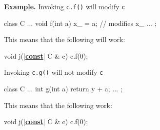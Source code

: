 \textbf{Example.} Invoking \texttt{c.f()} will modify \texttt{c}

\begin{consolethree}[escapeinside=||]
class C
{
    ...
    void f(int a){ x_ = a; } // modifies x_
    ...
};
\end{consolethree}

This means that the following will  work:

\begin{consolethree}[escapeinside=||]
void j(|\textbf{\underline{const}}| C & c) { c.f(0); }
\end{consolethree}

Invoking \texttt{c.g()} will not modify \texttt{c}

\begin{consolethree}[escapeinside=||]
class C
{
    ...
    int g(int a)
    {
        return y + a;
    }
    ...
};
\end{consolethree}

This means that the following  work:

\begin{consolethree}[escapeinside=||]
void j(|\textbf{\underline{const}}| C & c) { c.f(0); }
\end{consolethree}




